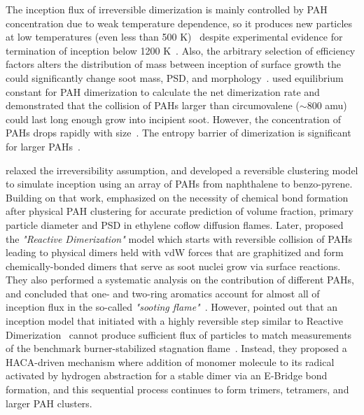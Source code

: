  

The inception flux of irreversible dimerization is mainly controlled by PAH concentration due to weak temperature dependence, so it produces new particles at low temperatures (even less than 500 K)~\citep{naseri2022simulating} despite experimental evidence for termination of inception below 1200 K~\citep{sanchez2012polycyclic, cho2016synthesis}. Also, the arbitrary selection of efficiency factors alters the distribution of mass between inception of surface growth the could significantly change soot mass, PSD, and morphology~\citep{saffaripour2014experimental}. \citet{miller1991kinetics} used equilibrium constant for PAH dimerization to calculate the net dimerization rate and demonstrated that the collision of PAHs larger than circumovalene ($\sim$800 amu) could last long enough grow into incipient soot. However, the concentration of PAHs drops rapidly with size~\citep{Wang2011}. The entropy barrier of dimerization is significant for larger PAHs~\citep{giordana2011theoretical}.  


\citet{eaves2015importance} relaxed the irreversibility assumption, and developed a reversible clustering model to simulate inception using an array of PAHs from naphthalene to benzo-pyrene. Building on that work, \citet{kholghy2019role} emphasized on the necessity of chemical bond formation after physical PAH clustering for accurate prediction of volume fraction, primary particle diameter and PSD in ethylene coflow diffusion flames. Later, \citet{kholghy2018reactive} proposed the \textit{"Reactive Dimerization"} model which starts with reversible collision of PAHs leading to physical dimers held with vdW forces that are graphitized and form chemically-bonded dimers that serve as soot nuclei grow via surface reactions. They also performed a systematic analysis on the contribution of different PAHs, and concluded that one- and two-ring aromatics account for almost all of inception flux in the so-called \textit{"sooting flame"}~\citep{desgroux2017comparative}. However, \citet{frenklach2020mechanism} pointed out that an inception model that initiated with a highly reversible step similar to Reactive Dimerization~\citep{kholghy2018reactive} cannot produce sufficient flux of particles to match measurements of the benchmark burner-stabilized stagnation flame~\citep{abid2009quantitative}. Instead, they proposed a HACA-driven mechanism where addition of monomer molecule to its radical activated by hydrogen abstraction for a stable dimer via an E-Bridge bond formation, and this sequential process continues to form trimers, tetramers, and larger PAH clusters.

